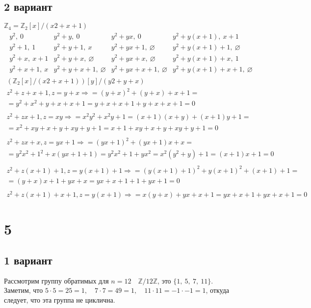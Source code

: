 	\subsection{2 вариант}
	$\mathbb{Z}_4 = \mathbb{Z}_2[x]/(x2 + x + 1)$
	\begin{gather*}
		\begin{matrix}
			y^2,\ 0 & y^2 + y,\ 0 & y^2 + yx,\ 0 & y^2 + y(x + 1),\ x + 1 \\
			y^2 + 1,\ 1 & y^2 + y + 1,\ x & y^2 + yx + 1,\ \varnothing & y^2 + y(x + 1) + 1,\ \varnothing \\
			y^2 + x,\ x + 1 & y^2 + y + x,\ \varnothing & y^2 + yx + x,\ \varnothing & y^2 + y(x + 1) + x,\ 1\\
			y^2 + x + 1,\ x & y^2 + y + x + 1,\ \varnothing & y^2 + yx + x + 1,\ \varnothing & y^2 + y(x + 1) + x + 1,\  \varnothing
		\end{matrix}
		\\
		(\mathbb{Z}_2[x]/(x2 + x + 1))[y]/(y2 + y + x)\\
		z^2 + z + x + 1, z = y + x \Rightarrow = (y + x)^2 + (y + x) + x + 1 = \\ = y^2 + x^2 + y + x + x + 1 = y + x + x + 1 + y + x + x + 1 = 0
		\\ \\
		z^2 + zx + 1, z = xy \Rightarrow = x^2y^2 + x^2y + 1 = (x + 1)(x + y) + (x + 1)y + 1 = \\ = x^2 + xy + x + y + xy + y + 1 = x + 1 + xy + x + y + xy + y + 1 = 0
		\\ \\
		z^2 + zx + x, z = yx + 1 \Rightarrow = (yx + 1)^2 + (yx + 1)x + x = \\ = y^2x^2 + 1^2 + x(yx + 1 + 1) = y^2x^2 + 1 + yx^2 = x^2(y^2 + y) + 1 = (x + 1)x + 1 = 0
		\\ \\
		z^2 + z(x + 1) + 1, z = y(x + 1) + 1 \Rightarrow = (y(x + 1) + 1)^2 + y(x + 1)^2 + (x + 1) + 1 = \\ = (y + x)x + 1 + yx + x = yx + x + 1 + 1 + yx + 1 = 0
		\\ \\
		z^2+z(x+1)+x+1, z = y(x+1) \Rightarrow = x(y+x)+yx+x+1 = yx+x+1+yx+x+1 = 0
	\end{gather*}
		
\newpage	
\section{5}
	\subsection{1 вариант}
		Рассмотрим группу обратимых для $n = 12 \quad \mathbb{Z}/ 12 \mathbb{Z}$, это $\{ 1,\ 5,\ 7,\ 11 \}$.\\
		Заметим, что $5 \cdot 5 = 25 = 1,\quad 7 \cdot 7 = 49 = 1,\quad 11 \cdot 11 = -1 \cdot -1 = 1$, откуда следует, что эта группа не циклична.
		
